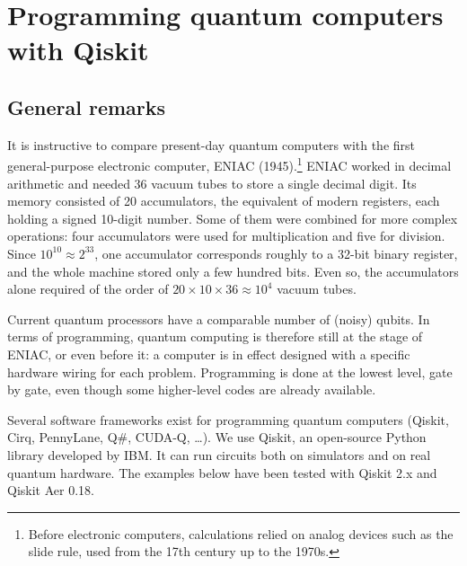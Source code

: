 \chapter{Programming quantum computers with Qiskit}\label{ch:qiskit}

\section{General remarks}
It is instructive to compare present-day quantum computers with the first general-purpose electronic computer, ENIAC (1945).\footnote{Before electronic computers, calculations relied on
analog devices such as the slide rule, used from the 17th century up to the 1970s.} ENIAC worked in decimal arithmetic and needed 36 vacuum tubes to store a single decimal digit. Its memory
consisted of 20 accumulators, the equivalent of modern registers, each holding a signed 10-digit number. Some of them were combined for more complex operations: four accumulators were used
for multiplication and five for division. Since $10^{10}\approx2^{33}$, one accumulator corresponds roughly to a 32-bit binary register, and the whole machine stored only a few hundred bits.
Even so, the accumulators alone required of the order of $20\times10\times36\approx10^4$ vacuum tubes.

Current quantum processors have a comparable number of (noisy) qubits. In terms of programming, quantum computing is therefore still at the stage of ENIAC, or even before it: a computer is in
effect designed with a specific hardware wiring for each problem. Programming is done at the lowest level, gate by gate, even though some higher-level codes are already available.

Several software frameworks exist for programming quantum computers (Qiskit, Cirq, PennyLane, Q\#, CUDA-Q, \dots). We use Qiskit, an open-source Python library developed by IBM. It can run
circuits both on simulators and on real quantum hardware. The examples below have been tested with Qiskit 2.x and Qiskit Aer 0.18.

